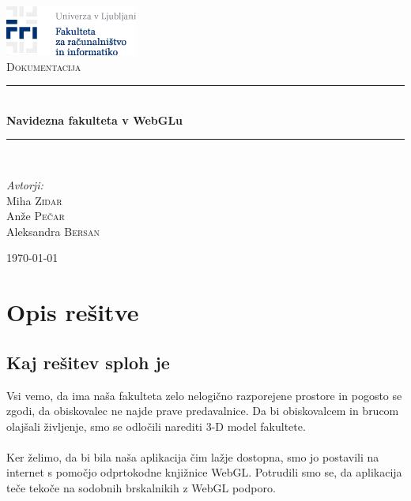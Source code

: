 \documentclass[10pt,a4paper]{article}
\begin{document}
\begin{titlepage}
\begin{center}

\includegraphics{Screenshot.png}\\[4.0cm]    
\textsc{\Large Dokumentacija}\\[4.5cm]

\hrule \ \\[0.2cm]
{ \huge \bfseries Navidezna fakulteta v WebGLu}\\[0.3cm]
\hrule \ \\[4.5cm]

\begin{minipage}{0.4\textwidth}
\begin{flushleft} \large
\emph{Avtorji:}\\
Miha \textsc{Zidar}\\
Anže \textsc{Pečar}\\
Aleksandra \textsc{Bersan}\\
\end{flushleft}
\end{minipage}
\begin{minipage}{0.4\textwidth}
\begin{flushright} \large
\end{flushright}
\end{minipage}
\vfill

{\large \today}
\end{center}
\end{titlepage}
\pagebreak
\section{Opis rešitve}
\subsection{Kaj rešitev sploh je}
Vsi vemo, da ima naša fakulteta zelo nelogično razporejene prostore in pogosto 
se zgodi, da obiskovalec ne najde prave predavalnice. Da bi obiskovalcem in 
brucom olajšali življenje, smo se odločili narediti 3-D model fakultete.\\\\
Ker želimo, da bi bila naša aplikacija čim lažje dostopna, smo jo postavili na 
internet s pomočjo odprtokodne knjižnice WebGL. Potrudili smo se, da aplikacija 
teče tekoče na sodobnih brskalnikih z WebGL podporo.
\end{document}
